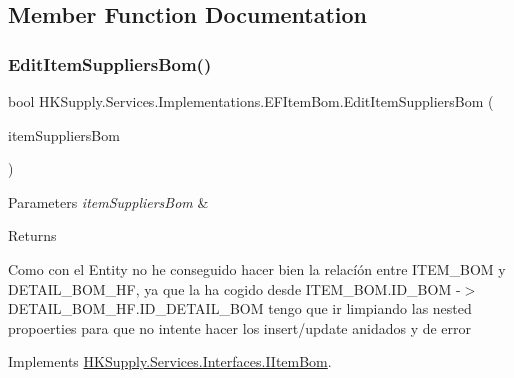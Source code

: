 \subsection{Member Function Documentation}
\mbox{\label{class_h_k_supply_1_1_services_1_1_implementations_1_1_e_f_item_bom_a66d0c1f604104f7e54d059db6423ceb3}} 
\subsubsection{\texorpdfstring{Edit\+Item\+Suppliers\+Bom()}{EditItemSuppliersBom()}}
{\footnotesize\ttfamily bool H\+K\+Supply.\+Services.\+Implementations.\+E\+F\+Item\+Bom.\+Edit\+Item\+Suppliers\+Bom (\begin{DoxyParamCaption}\item[{List$<$ \mbox{\hyperlink{class_h_k_supply_1_1_models_1_1_item_bom}{Item\+Bom}} $>$}]{item\+Suppliers\+Bom }\end{DoxyParamCaption})}






\begin{DoxyParams}{Parameters}
{\em item\+Suppliers\+Bom} & \\
\hline
\end{DoxyParams}
\begin{DoxyReturn}{Returns}

\end{DoxyReturn}


Como con el Entity no he conseguido hacer bien la relacíón entre I\+T\+E\+M\+\_\+\+B\+OM y D\+E\+T\+A\+I\+L\+\_\+\+B\+O\+M\+\_\+\+HF, ya que la ha cogido desde I\+T\+E\+M\+\_\+\+B\+O\+M.\+I\+D\+\_\+\+B\+OM -\/$>$ D\+E\+T\+A\+I\+L\+\_\+\+B\+O\+M\+\_\+\+H\+F.\+I\+D\+\_\+\+D\+E\+T\+A\+I\+L\+\_\+\+B\+OM tengo que ir limpiando las nested propoerties para que no intente hacer los insert/update anidados y de error 

Implements \mbox{\hyperlink{interface_h_k_supply_1_1_services_1_1_interfaces_1_1_i_item_bom}{H\+K\+Supply.\+Services.\+Interfaces.\+I\+Item\+Bom}}.

